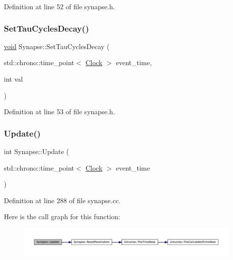 Definition at line 52 of file synapse.\+h.

\mbox{\label{class_synapse_a5bbee6bb7dc49c90b7c3413d02e06cc8}} 
\subsubsection{\texorpdfstring{Set\+Tau\+Cycles\+Decay()}{SetTauCyclesDecay()}}
{\footnotesize\ttfamily \mbox{\hyperlink{glad_8h_a950fc91edb4504f62f1c577bf4727c29}{void}} Synapse\+::\+Set\+Tau\+Cycles\+Decay (\begin{DoxyParamCaption}\item[{std\+::chrono\+::time\+\_\+point$<$ \mbox{\hyperlink{universe_8h_a0ef8d951d1ca5ab3cfaf7ab4c7a6fd80}{Clock}} $>$}]{event\+\_\+time,  }\item[{int}]{val }\end{DoxyParamCaption})\hspace{0.3cm}{\ttfamily [inline]}}



Definition at line 53 of file synapse.\+h.

\mbox{\label{class_synapse_a37c64f579846cf18d09b3b262d566ffe}} 
\subsubsection{\texorpdfstring{Update()}{Update()}}
{\footnotesize\ttfamily int Synapse\+::\+Update (\begin{DoxyParamCaption}\item[{std\+::chrono\+::time\+\_\+point$<$ \mbox{\hyperlink{universe_8h_a0ef8d951d1ca5ab3cfaf7ab4c7a6fd80}{Clock}} $>$}]{event\+\_\+time }\end{DoxyParamCaption})}



Definition at line 288 of file synapse.\+cc.

Here is the call graph for this function\+:\nopagebreak
\begin{figure}[H]
\begin{center}
\leavevmode
\includegraphics[width=350pt]{class_synapse_a37c64f579846cf18d09b3b262d566ffe_cgraph}
\end{center}
\end{figure}


